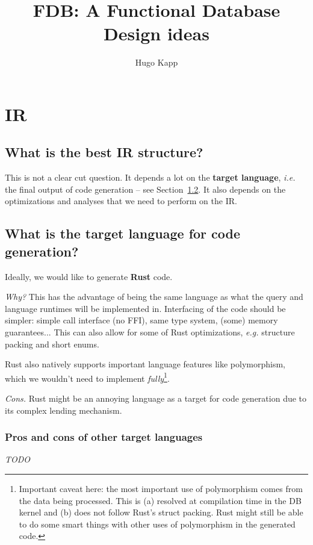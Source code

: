 \documentclass[10pt,a4paper]{article}
\title{FDB: A Functional Database \\ Design ideas}
\author{Hugo Kapp}
\newcommand{\ie}[0]{\textit{i.e.}}
\newcommand{\eg}[0]{\textit{e.g.}}
\begin{document}
\maketitle

\section{IR}

\subsection{What is the best IR structure?}

This is not a clear cut question.
It depends a lot on the \textbf{target language}, \ie{} the final output of code generation -- see Section~\ref{sec:targetlanguage}.
It also depends on the optimizations and analyses that we need to perform on the IR.

\subsection{What is the target language for code generation?}
\label{sec:targetlanguage}

Ideally, we would like to generate \textbf{Rust} code.

\textit{Why?}
This has the advantage of being the same language as what the query and language runtimes will be implemented in.
Interfacing of the code should be simpler: simple call interface (no FFI), same type system, (some) memory guarantees...
This can also allow for some of Rust optimizations, \eg{} structure packing and short enums.

Rust also natively supports important language features like polymorphism, which we wouldn't need to implement \textit{fully}\footnote{
	Important caveat here: the most important use of polymorphism comes from the data being processed.
	This is (a) resolved at compilation time in the DB kernel and (b) does not follow Rust's struct packing.
	Rust might still be able to do some smart things with other uses of polymorphism in the generated code.
}.

\textit{Cons.}
Rust might be an annoying language as a target for code generation due to its complex lending mechanism.

\subsubsection{Pros and cons of other target languages}

\textit{TODO}
\end{document}
